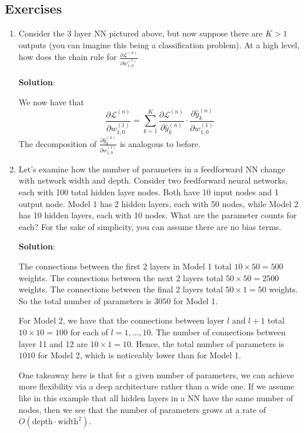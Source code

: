 \documentclass[11pt, letterpaper]{article}
\theoremstyle{definition}
\theoremstyle{plain}
\newenvironment{solution}{
    \vspace{2mm}
    \color{blue}\noindent\textbf{Solution}:
}{}
\begin{document}
\subsection{Exercises}

\begin{mdframed}
    \begin{enumerate}
        \item Consider the 3 layer NN pictured above, but now suppose there are $K > 1$ outputs (you can imagine this being a classification problem). At a high level, how does the chain rule for $\frac{\partial \mathcal{L}^{(n)}}{\partial w_{1, 0}^{(1)}}$
        
        \begin{solution}
            
            We now have that 
            \[\frac{\partial \mathcal{L}^{(n)}}{\partial w_{1, 0}^{(1)}} = \sum_{k=1}^{K} \frac{\partial \mathcal{L}^{(n)}}{\partial \hat{y}^{(n)}_k} \cdot \frac{\partial \hat{y}^{(n)}_k}{\partial w_{1, 0}^{(1)}}\]
            The decomposition of $\frac{\partial \hat{y}^{(n)}_k}{\partial w_{1, 0}^{(1)}}$ is analogous to before. 
        \end{solution}

        \item Let's examine how the number of parameters in a feedforward NN change with network width and depth. Consider two feedforward neural networks, each with 100 total hidden layer nodes. Both have 10 input nodes and 1 output node. Model 1 has 2 hidden layers, each with 50 nodes, while Model 2 has 10 hidden layers, each with 10 nodes. What are the parameter counts for each? For the sake of simplicity, you can assume there are no bias terms. 
        
        \begin{solution}
            The connections between the first 2 layers in Model 1 total $10 \times 50 = 500$ weights. The connections between the next 2 layers total $50 \times 50 = 2500$ weights. The connections between the final 2 layers total $50 \times 1 = 50$ weights. So the total number of parameters is $3050$ for Model 1. 

            For Model 2, we have that the connections between layer $l$ and $l+1$ total $10 \times 10 = 100$ for each of $l = 1, \ldots, 10$. The number of connections between layer 11 and 12 are $10 \times 1 = 10$. Hence, the total number of parameters is $1010$ for Model 2, which is noticeably lower than for Model 1.

            One takeaway here is that for a given number of parameters, we can achieve more flexibility via a deep architecture rather than a wide one. If we assume like in this example that all hidden layers in a NN have the same number of nodes, then we see that the number of parameters grows at a rate of $O(\text{depth} \cdot \text{width}^2)$.
        \end{solution}
    \end{enumerate}
\end{mdframed}
\end{document}
